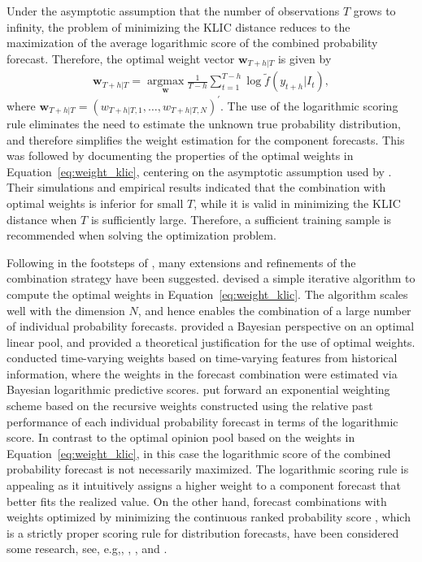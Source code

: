 \documentclass[a4paper,11pt]{article}
\begin{document}
Under the asymptotic assumption that the number of observations $T$ grows to infinity, the problem of minimizing the KLIC distance reduces to the maximization of the average logarithmic score of the combined probability forecast. Therefore, the optimal weight vector $\bm{w}_{T+h|T}$ is given by
\begin{align}
  \label{eq:weight_klic}
  \bm{w}_{T+h|T} = \underset{\bm{w}}{\operatorname{argmax}} \frac{1}{T-h} \sum_{t=1}^{T-h} \log \tilde{f}(y_{t+h}|I_{t}),
\end{align}
where $\bm{w}_{T+h|T}=\left(w_{T+h|T, 1}, \dots, w_{T+h|T, N}\right)^{\prime}$. The use of the logarithmic scoring rule eliminates the need to estimate the unknown true probability distribution, and therefore simplifies the weight estimation for the component forecasts. This was followed by \citet{Pauwels2016-ci} documenting the properties of the optimal weights in Equation~\eqref{eq:weight_klic}, centering on the asymptotic assumption used by \citet{Hall2007-lh}. Their simulations and empirical results indicated that the combination with optimal weights is inferior for small $T$, while it is valid in minimizing the KLIC distance when $T$ is sufficiently large. Therefore, a sufficient training sample is recommended when solving the optimization problem.

Following in the footsteps of \citet{Hall2007-lh}, many extensions and refinements of the combination strategy have been suggested. \citet{Conflitti2015-fq} devised a simple iterative algorithm to compute the optimal weights in Equation~\eqref{eq:weight_klic}. The algorithm scales well with the dimension $N$, and hence enables the combination of a large number of individual probability forecasts. \citet{Geweke2011-xk} provided a Bayesian perspective on an optimal linear pool, and provided a theoretical justification for the use of optimal weights. \citet{Li2021-gk} conducted time-varying weights based on time-varying features from historical information, where the weights in the forecast combination were estimated via Bayesian logarithmic predictive scores. \citet{Jore2010-yi} put forward an exponential weighting scheme based on the recursive weights constructed using the relative past performance of each individual probability forecast in terms of the logarithmic score. In contrast to the optimal opinion pool based on the weights in Equation~\eqref{eq:weight_klic}, in this case the logarithmic score of the combined probability forecast is not necessarily maximized. The logarithmic scoring rule is appealing as it intuitively assigns a higher weight to a component forecast that better fits the realized value. On the other hand, forecast combinations with weights optimized by minimizing the continuous ranked probability score \citep[CRPS,][]{Gneiting2007-ij}, which is a strictly proper scoring rule for distribution forecasts, have been considered some research, see, e.g,, \citet{Raftery2005-vu}, \citet{Thorey2017-on}, and \citet{Thorey2018-en}.
\end{document}

